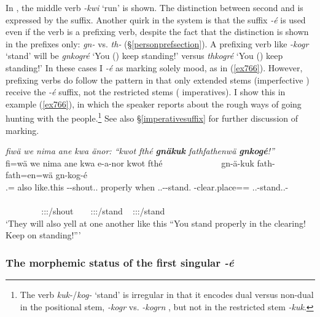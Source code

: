 In , the middle verb \emph{-kwi} `run' is shown. The distinction between second  and  is expressed by the suffix. Another quirk in the system is that the suffix \emph{-é} is used even if the verb is a prefixing verb, despite the fact that the  distinction is shown in the prefixes only: \emph{gn-} \Ssg{} vs. \emph{th-} \Snsg{} (\S\ref{personprefsection}). A prefixing verb like \emph{-kogr} `stand' will be \emph{gnkogré} `You (\Sg) keep standing!' versus \emph{thkogré} `You (\Pl) keep standing!' In these cases I  \emph{-é} as marking solely  mood, as in (\ref{ex766}). However, prefixing verbs do follow the pattern in that only extended stems (imperfective ) receive the \emph{-é} suffix, not the restricted stems ( imperatives). I show this in example (\ref{ex766}), in which the speaker reports about the rough ways of going hunting with the  people.\footnote{The verb \emph{kuk-}/\emph{kog-} `stand' is irregular in that it encodes dual versus non-dual in the positional stem, \emph{-kogr} {\Ndu} vs. \emph{-kogrn} {\Du}, but not in the restricted stem \emph{-kuk}.} See also \S\ref{imperativesuffix} for further discussion of  marking.

\begin{exe}
	\ex \emph{fiwä we nima ane kwa änor: ``kwot fthé \textbf{gnäkuk} fathfathenwä \textbf{gnkogé}!''}\\
	\glll fi=wä we nima ane kwa e-a-nor kwot fthé~~~~~~~~~~~~~ gn-ä-kuk fath-fath=en=wä gn-kog-é\\
	\Third.{\Abs}={\Emph} also like.this {\Dem} {\Fut} \Stnsg-\Vc-shout.\Ext.{\Ndu} properly when \Ssg.\Bet.\Imp-\Ndu-stand.{\Rs} \Redup-clear.place=\Loc={\Emph} \Ssg.\Bet.\Imp-stand.\Ext.\Ndu-{\Imp}\\\\
	~ ~ ~ ~ ~ {\footnotesize \Tpl:\Sbj:\Nonpast:\Ipfv/shout} ~ ~ {\footnotesize \Ssg:\Sbj:\Imp:\Pfv/stand} ~ {\footnotesize \Ssg:\Sbj:\Imp:\Ipfv/stand}\\
	\trans `They will also yell at one another like this ``You stand properly in the clearing! Keep on standing!''' 
	\label{ex766}
\end{exe}

\subsubsection{The morphemic status of the first singular \emph{-é}} \label{personsufffsg}

